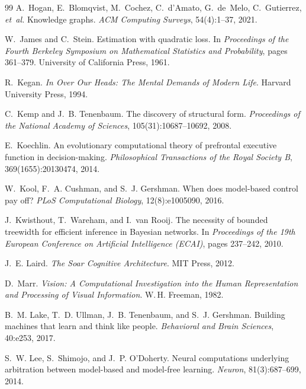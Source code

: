 \documentclass[11pt]{article}
\begin{document}
\begin{thebibliography}{99}
A.~Hogan, E.~Blomqvist, M.~Cochez, C.~d'Amato, G.~de~Melo, C.~Gutierrez, \emph{et~al.}
\newblock Knowledge graphs.
\newblock \emph{ACM Computing Surveys}, 54(4):1--37, 2021.

W.~James and C.~Stein.
\newblock Estimation with quadratic loss.
\newblock In \emph{Proceedings of the Fourth Berkeley Symposium on Mathematical Statistics and Probability}, pages 361--379. University of California Press, 1961.

R.~Kegan.
\newblock \emph{In Over Our Heads: The Mental Demands of Modern Life}.
\newblock Harvard University Press, 1994.

C.~Kemp and J.~B. Tenenbaum.
\newblock The discovery of structural form.
\newblock \emph{Proceedings of the National Academy of Sciences}, 105(31):10687--10692, 2008.

E.~Koechlin.
\newblock An evolutionary computational theory of prefrontal executive function in decision-making.
\newblock \emph{Philosophical Transactions of the Royal Society B}, 369(1655):20130474, 2014.

W.~Kool, F.~A. Cushman, and S.~J. Gershman.
\newblock When does model-based control pay off?
\newblock \emph{PLoS Computational Biology}, 12(8):e1005090, 2016.

J.~Kwisthout, T.~Wareham, and I.~van Rooij.
\newblock The necessity of bounded treewidth for efficient inference in {B}ayesian networks.
\newblock In \emph{Proceedings of the 19th European Conference on Artificial Intelligence (ECAI)}, pages 237--242, 2010.

J.~E. Laird.
\newblock \emph{The Soar Cognitive Architecture}.
\newblock MIT Press, 2012.

D.~Marr.
\newblock \emph{Vision: A Computational Investigation into the Human Representation and Processing of Visual Information}.
\newblock W.\,H. Freeman, 1982.

B.~M. Lake, T.~D. Ullman, J.~B. Tenenbaum, and S.~J. Gershman.
\newblock Building machines that learn and think like people.
\newblock \emph{Behavioral and Brain Sciences}, 40:e253, 2017.

S.~W. Lee, S.~Shimojo, and J.~P. O'Doherty.
\newblock Neural computations underlying arbitration between model-based and model-free learning.
\newblock \emph{Neuron}, 81(3):687--699, 2014.


\end{thebibliography}
\end{document}
